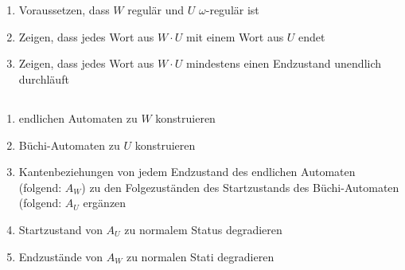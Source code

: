 \documentclass[10pt,a4paper,oneside,ngerman,numbers=noenddot]{scrartcl}
\begin{document}
\section{} %
	\subsection{} %
		\begin{enumerate}
			\item Voraussetzen, dass \(W\) regulär und \(U\) \(\omega\)-regulär ist
			\item Zeigen, dass jedes Wort aus \(W \cdot U\) mit einem Wort aus \(U\) endet
			\item Zeigen, dass jedes Wort aus \(W \cdot U\) mindestens einen Endzustand unendlich durchläuft
		\end{enumerate}
	\subsection{} %
		\begin{enumerate}
			\item endlichen Automaten zu \(W\) konstruieren
			\item Büchi-Automaten zu \(U\) konstruieren
			\item Kantenbeziehungen von jedem Endzustand des endlichen Automaten (folgend: \(A_{W}\)) zu den Folgezuständen des Startzustands des Büchi-Automaten (folgend: \(A_{U}\) ergänzen
			\item Startzustand von \(A_{U}\) zu normalem Status degradieren
			\item Endzustände von \(A_{W}\) zu normalen Stati degradieren
		\end{enumerate}
	\subsection{} %
		
	\subsection{} %
\end{document}
